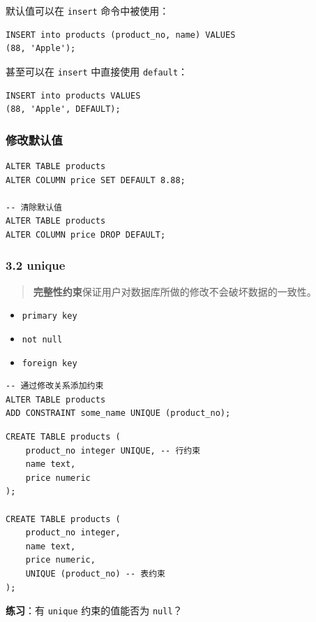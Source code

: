 \documentclass[aspectratio=169, 14pt]{beamer}
\begin{document}
\begin{frame}[fragile]
    默认值可以在 \texttt{insert} 命令中被使用：

    \begin{verbatim}
INSERT into products (product_no, name) VALUES
(88, 'Apple');
    \end{verbatim}

甚至可以在 \texttt{insert} 中直接使用 \texttt{default}：

\begin{verbatim}
INSERT into products VALUES
(88, 'Apple', DEFAULT);
\end{verbatim}

\end{frame}

\begin{frame}[fragile]
    \frametitle{修改默认值}

    \begin{verbatim}
ALTER TABLE products 
ALTER COLUMN price SET DEFAULT 8.88;

-- 清除默认值
ALTER TABLE products 
ALTER COLUMN price DROP DEFAULT;
    \end{verbatim}
    
\end{frame}

\begin{frame}[fragile]
    \frametitle{3.2 unique}
\begin{quote}
    \textbf{完整性约束}保证用户对数据库所做的修改不会破坏数据的一致性。
\end{quote}

\begin{itemize}
    \item \texttt{primary key}
    \item \texttt{not null}
    \item \texttt{foreign key}
\end{itemize}
\pause

\begin{verbatim}
-- 通过修改关系添加约束
ALTER TABLE products 
ADD CONSTRAINT some_name UNIQUE (product_no);
\end{verbatim}

\end{frame}

\begin{frame}[fragile]

    \begin{verbatim}
CREATE TABLE products (
    product_no integer UNIQUE, -- 行约束
    name text,
    price numeric
);

CREATE TABLE products (
    product_no integer,
    name text,
    price numeric,
    UNIQUE (product_no) -- 表约束
);
    \end{verbatim} 

\textbf{练习}：有 \texttt{unique} 约束的值能否为 \texttt{null}？

\end{frame}
\end{document}
